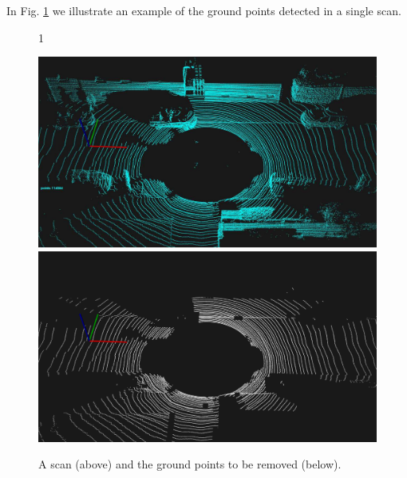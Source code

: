 In Fig. \ref{fig:groundremoval} we illustrate an example of the ground points detected in a single scan.


\begin{figure}
\setlength{\tabcolsep}{1pt}1
\begin{center}
\includegraphics[width=0.8\columnwidth]{./img/ch-laser/./beforeGroundRemoval} \\
\vspace{0.3cm}
\includegraphics[width=0.8\columnwidth]{./img/ch-laser/./postGroundRemoval}
\end{center}
\caption{A scan (above) and the ground points to be removed (below).}
\label{fig:groundremoval}
\end{figure}


